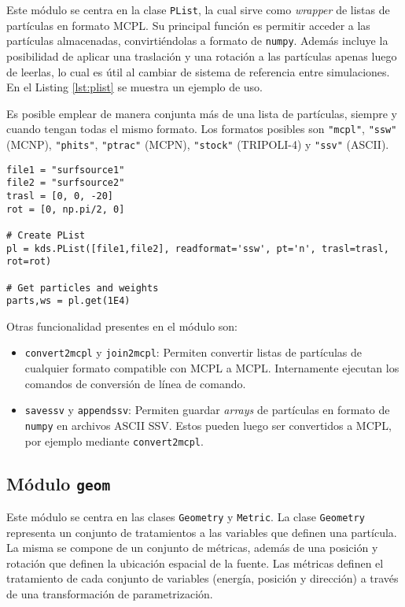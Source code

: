Este módulo se centra en la clase \verb|PList|, la cual sirve como \emph{wrapper} de listas de partículas en formato MCPL. Su principal función es permitir acceder a las partículas almacenadas, convirtiéndolas a formato de \verb|numpy|. Además incluye la posibilidad de aplicar una traslación y una rotación a las partículas apenas luego de leerlas, lo cual es útil al cambiar de sistema de referencia entre simulaciones. En el Listing \ref{lst:plist} se muestra un ejemplo de uso.

Es posible emplear de manera conjunta más de una lista de partículas, siempre y cuando tengan todas el mismo formato. Los formatos posibles son \verb|"mcpl"|, \verb|"ssw"| (MCNP), \verb|"phits"|, \verb|"ptrac"| (MCPN), \verb|"stock"| (TRIPOLI-4) y \verb|"ssv"| (ASCII).

\begin{lstlisting}[language=Python2, label={lst:plist}, caption=Ejemplo de uso de \texttt{PList}.]
file1 = "surfsource1"
file2 = "surfsource2"
trasl = [0, 0, -20]
rot = [0, np.pi/2, 0]

# Create PList
pl = kds.PList([file1,file2], readformat='ssw', pt='n', trasl=trasl, rot=rot)

# Get particles and weights
parts,ws = pl.get(1E4)
\end{lstlisting}

Otras funcionalidad presentes en el módulo son:
\begin{itemize}
	\item \verb|convert2mcpl| y \verb|join2mcpl|: Permiten convertir listas de partículas de cualquier formato compatible con MCPL a MCPL. Internamente ejecutan los comandos de conversión de línea de comando.
	\item \verb|savessv| y \verb|appendssv|: Permiten guardar \emph{arrays} de partículas en formato de \verb|numpy| en archivos ASCII SSV. Estos pueden luego ser convertidos a MCPL, por ejemplo mediante \verb|convert2mcpl|.
\end{itemize}


\subsection{Módulo \texttt{geom}}

Este módulo se centra en las clases \verb|Geometry| y \verb|Metric|. La clase \verb|Geometry| representa un conjunto de tratamientos a las variables que definen una partícula. La misma se compone de un conjunto de métricas, además de una posición y rotación que definen la ubicación espacial de la fuente. Las métricas definen el tratamiento de cada conjunto de variables (energía, posición y dirección) a través de una transformación de parametrización.

